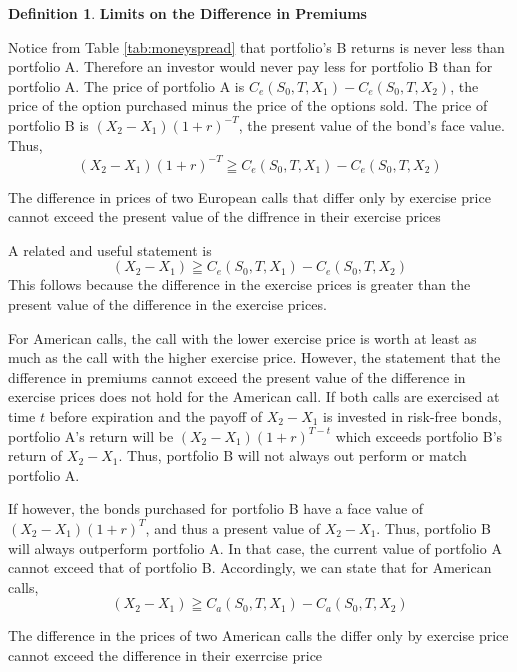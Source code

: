 \documentclass{book}
\theoremstyle{definition}
\newtheorem{definition}{Definition}[section]
\theoremstyle{remark}
\begin{document}
            \begin{definition}{\textbf{Limits on the Difference in Premiums}}
                
                Notice from Table \ref{tab:moneyspread} that portfolio's B returns is never less than portfolio A. Therefore an investor would never pay less for portfolio B than for portfolio A. The price of portfolio A is $C_e(S_0, T, X_1) - C_e(S_0, T, X_2)$, the price of the option purchased minus the price of the options sold. The price of portfolio B is $ (X_2 - X_1)(1+r)^{-T} $, the present value of the bond's face value. Thus, $$ (X_2 - X_1)(1+r)^{-T}  \geqq C_e(S_0, T, X_1) - C_e(S_0, T, X_2) $$
                
        \begin{tcolorbox}[colback=blue!5!white,colframe=blue!75!black, title=Sticky Note]
            The difference in prices of two European calls that differ only by exercise price cannot exceed the present value of the diffrence in their exercise prices 
        \end{tcolorbox}  
                
                A related and useful statement is $$ (X_2 - X_1)  \geqq C_e(S_0, T, X_1) - C_e(S_0, T, X_2) $$
                This follows because the difference in the exercise prices is greater than the present value of the difference in the exercise prices. 
                
                For American calls, the call with the lower exercise price is worth at least as much as the call with the higher exercise price. However, the statement that the difference in premiums cannot exceed the present value of the difference in exercise prices does not hold for the American call. If both calls are exercised at time $t$ before expiration and the payoff of $X_2 - X_1$ is invested in risk-free bonds, portfolio A's return will be $(X_2 - X_1)(1+r)^{T-t}$ which exceeds portfolio B's return of $X_2 - X_1$. Thus, portfolio B will not always out perform or match portfolio A.
                
                If however, the bonds purchased for portfolio B have a face value of $(X_2 - X_1)(1 + r)^T$, and thus a present value of $X_2 - X_1$. Thus, portfolio B will always outperform portfolio A. In that case, the current value of portfolio A cannot exceed that of portfolio B. Accordingly, we can state that for American calls, $$ (X_2 - X_1)  \geqq C_a(S_0, T, X_1) - C_a(S_0, T, X_2) $$
                
        \begin{tcolorbox}[colback=blue!5!white,colframe=blue!75!black, title=Sticky Note]
            The difference in the prices of two American calls the differ only by exercise price cannot exceed the difference in their exerrcise price
        \end{tcolorbox}                  
                

\end{definition}
\end{document}
